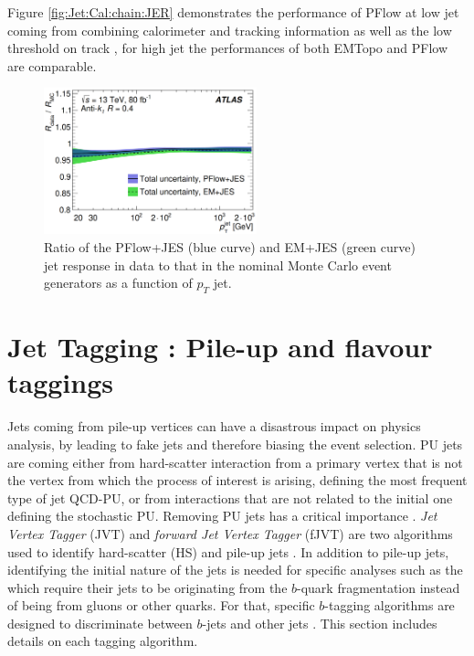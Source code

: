 Figure \ref{fig:Jet:Cal:chain:JER} demonstrates the performance of PFlow at low jet \pT coming from combining calorimeter and tracking information as well as the low threshold on track \pT, for high jet \pT the performances of both EMTopo and PFlow are comparable. 
\begin{figure}[htbp]
    \centering
    \includegraphics[width=0.55\textwidth]{Ch4/Img/Jet_MC_Data_Ration.png}
    \caption{Ratio of the PFlow+JES (blue curve) and EM+JES (green curve) jet response in data to that in the nominal Monte Carlo event generators as a function of $p_T$ jet.}
    \label{fig:Jet:Cal:chain:InSitu}
\end{figure}

\section{Jet Tagging : Pile-up and flavour taggings}
\label{Jet:Tag}
Jets coming from pile-up vertices can have a disastrous impact on physics analysis, by leading to fake jets and therefore biasing the event selection. PU jets are coming either from hard-scatter interaction from a primary vertex that is not the vertex from which the process of interest is arising, defining the most frequent type of jet QCD-PU, or from interactions that are not related to the initial one defining the stochastic PU. Removing PU jets has a critical importance \cite{Tagging_2013, Tagging_2014}. \textit{Jet Vertex Tagger} (JVT) and \textit{forward Jet Vertex Tagger} (fJVT) are two algorithms used to identify hard-scatter (HS) and pile-up jets \cite{JVT_2014, fJVT}. In addition to pile-up jets, identifying the initial nature of the jets is needed for specific analyses such as the \HHyybb which require their jets to be originating from the $b$-quark fragmentation instead of being from gluons or other quarks. For that, specific $b$-tagging algorithms are designed to discriminate between $b$-jets and other jets \cite{Light_Quark_Tagger}. This section includes details on each tagging algorithm. 

